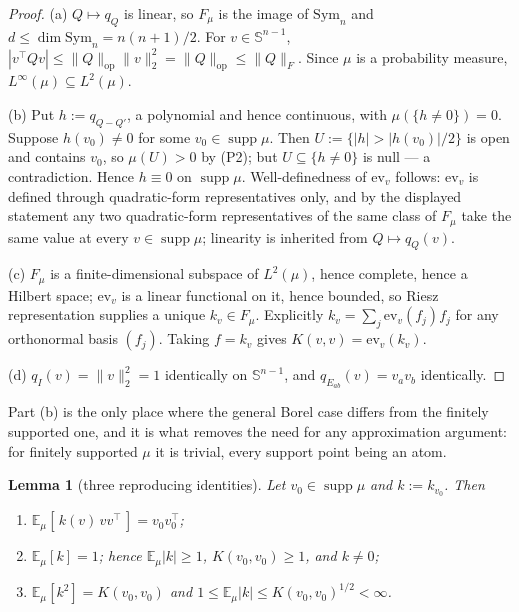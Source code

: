 \documentclass[11pt]{article}
\newtheorem{lemma}[theorem]{Lemma}
\theoremstyle{remark}
\newcommand{\Sph}{\mathbb{S}^{n-1}}
\newcommand{\Ex}{\mathbb{E}}
\newcommand{\Sym}{\mathrm{Sym}_n}
\newcommand{\Fm}{F_\mu}
\newcommand{\supp}{\operatorname{supp}}
\newcommand{\ev}{\mathrm{ev}}
\begin{document}
\begin{proof}
(a) $Q\mapsto q_Q$ is linear, so $\Fm$ is the image of $\Sym$ and $d\leq\dim\Sym=n(n+1)/2$.
For $v\in\Sph$, $|v^{\top}Qv|\leq\|Q\|_{\mathrm{op}}\|v\|_2^2=\|Q\|_{\mathrm{op}}\leq\|Q\|_F$.
Since $\mu$ is a probability measure, $L^{\infty}(\mu)\subseteq L^2(\mu)$.

(b) Put $h:=q_{Q-Q'}$, a polynomial and hence continuous, with $\mu(\{h\neq 0\})=0$. Suppose
$h(v_0)\neq 0$ for some $v_0\in\supp\mu$. Then $U:=\{|h|>|h(v_0)|/2\}$ is open and contains
$v_0$, so $\mu(U)>0$ by (P2); but $U\subseteq\{h\neq 0\}$ is null --- a contradiction. Hence
$h\equiv 0$ on $\supp\mu$. Well-definedness of $\ev_v$ follows: $\ev_v$ is defined through
quadratic-form representatives only, and by the displayed statement any two quadratic-form
representatives of the same class of $\Fm$ take the same value at every $v\in\supp\mu$;
linearity is inherited from $Q\mapsto q_Q(v)$.

(c) $\Fm$ is a finite-dimensional subspace of $L^2(\mu)$, hence complete, hence a Hilbert
space; $\ev_v$ is a linear functional on it, hence bounded, so Riesz representation supplies a
unique $k_v\in\Fm$. Explicitly $k_v=\sum_j \ev_v(f_j)f_j$ for any orthonormal basis $(f_j)$.
Taking $f=k_v$ gives $K(v,v)=\ev_v(k_v)$.

(d) $q_I(v)=\|v\|_2^2=1$ identically on $\Sph$, and $q_{E_{ab}}(v)=v_av_b$ identically.
\end{proof}

\noindent Part (b) is the only place where the general Borel case differs from the finitely
supported one, and it is what removes the need for any approximation argument: for finitely
supported $\mu$ it is trivial, every support point being an atom.

\begin{lemma}[three reproducing identities]\label{lem:2}
Let $v_0\in\supp\mu$ and $k:=k_{v_0}$. Then
\begin{enumerate}
\item[(i)] $\Ex_\mu[\,k(v)\,vv^{\top}\,] = v_0v_0^{\top}$;
\item[(ii)] $\Ex_\mu[k]=1$; hence $\Ex_\mu|k|\geq 1$, $K(v_0,v_0)\geq 1$, and $k\neq 0$;
\item[(iii)] $\Ex_\mu[k^2]=K(v_0,v_0)$ and $1\leq\Ex_\mu|k|\leq K(v_0,v_0)^{1/2}<\infty$.
\end{enumerate}
\end{lemma}
\end{document}
